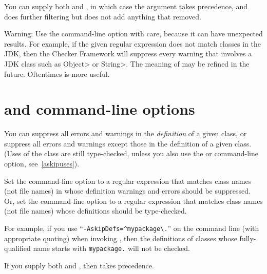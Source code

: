 You can supply both  and , in which case
the  argument takes precedence, and  does
further filtering but does not add anything that  removed.

Warning:  Use the  command-line option with care,
because it can have unexpected results.  For example, if the
given regular expression does not match classes in the JDK, then the
Checker Framework will suppress every warning that involves a JDK class
such as \<Object> or \<String>.  The meaning of  may be
refined in the future.  Oftentimes  is more useful.



\section{ and  command-line options\label{askipdefs}}

You can suppress all errors and warnings in the \emph{definition} of a given
class, or suppress all errors and warnings except those in the definition
of a given class.  (Uses of the class are still type-checked, unless you also use
the  or  command-line option,
see~\ref{askipuses}).

Set the  command-line option to a
regular expression that matches class names (not file names) in whose definition warnings and errors
should be suppressed.
Or, set the  command-line option to a
regular expression that matches class names (not file names) whose
definitions should be type-checked.

For example, if you use
``{\codesize\verb|-AskipDefs=^mypackage\.|}'' on the command line
(with appropriate quoting) when invoking
, then the definitions of 
classes whose fully-qualified name starts with \codesize\verb|mypackage.|
will not be checked.

If you supply both  and , then
 takes precedence.

